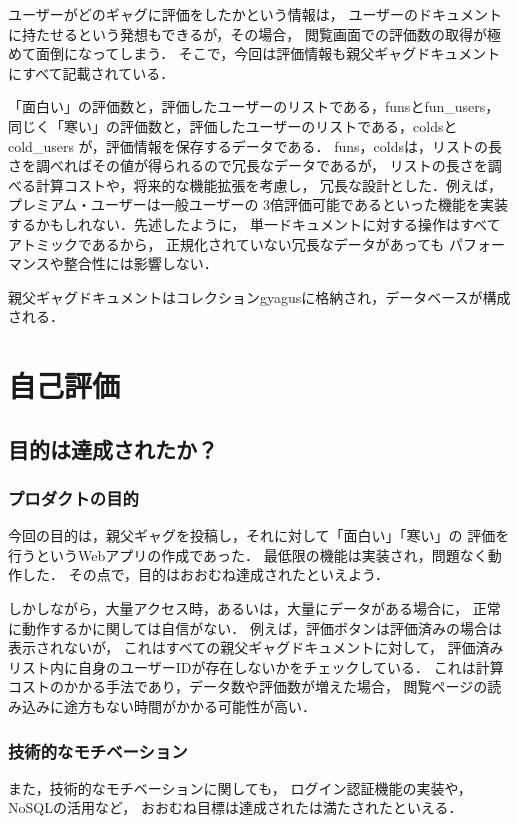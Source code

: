 \documentclass[a4paper,11pt]{jsreport}
\begin{document}
ユーザーがどのギャグに評価をしたかという情報は，
ユーザーのドキュメントに持たせるという発想もできるが，その場合，
閲覧画面での評価数の取得が極めて面倒になってしまう．
そこで，今回は評価情報も親父ギャグドキュメントにすべて記載されている．

「面白い」の評価数と，評価したユーザーのリストである，funsとfun\_users，
同じく「寒い」の評価数と，評価したユーザーのリストである，coldsとcold\_users
が，評価情報を保存するデータである．
funs，coldsは，リストの長さを調べればその値が得られるので冗長なデータであるが，
リストの長さを調べる計算コストや，将来的な機能拡張を考慮し，
冗長な設計とした．例えば，プレミアム・ユーザーは一般ユーザーの
3倍評価可能であるといった機能を実装するかもしれない．先述したように，
単一ドキュメントに対する操作はすべてアトミックであるから，
正規化されていない冗長なデータがあっても
パフォーマンスや整合性には影響しない．

親父ギャグドキュメントはコレクションgyagusに格納され，データベースが構成される．

\chapter{自己評価}
\section{目的は達成されたか？}
\subsection{プロダクトの目的}
今回の目的は，親父ギャグを投稿し，それに対して「面白い」「寒い」の
評価を行うというWebアプリの作成であった．
最低限の機能は実装され，問題なく動作した．
その点で，目的はおおむね達成されたといえよう．

しかしながら，大量アクセス時，あるいは，大量にデータがある場合に，
正常に動作するかに関しては自信がない．
例えば，評価ボタンは評価済みの場合は表示されないが，
これはすべての親父ギャグドキュメントに対して，
評価済みリスト内に自身のユーザーIDが存在しないかをチェックしている．
これは計算コストのかかる手法であり，データ数や評価数が増えた場合，
閲覧ページの読み込みに途方もない時間がかかる可能性が高い．

\subsection{技術的なモチベーション}
また，技術的なモチベーションに関しても，
ログイン認証機能の実装や，NoSQLの活用など，
おおむね目標は達成されたは満たされたといえる．
\end{document}
